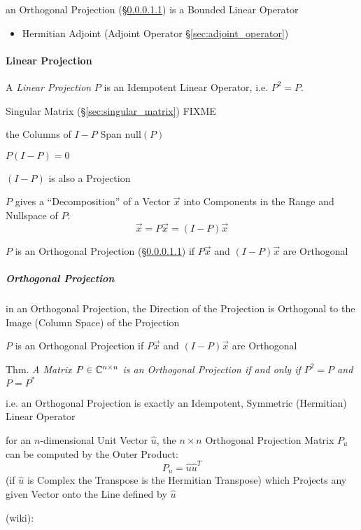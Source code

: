 an Orthogonal Projection (\S\ref{sec:orthogonal_projection}) is a Bounded
Linear Operator

\begin{itemize}
  \item Hermitian Adjoint (Adjoint Operator \S\ref{sec:adjoint_operator})
\end{itemize}



\paragraph{Linear Projection}\label{sec:projection}\hfill

A \emph{Linear Projection} $P$ is an Idempotent Linear Operator, i.e. $P^2 = P$.

Singular Matrix (\S\ref{sec:singular_matrix}) FIXME

the Columns of $I - P$ Span $\mathrm{null}(P)$

$P(I - P) = 0$

$(I - P)$ is also a Projection

$P$ gives a ``Decomposition'' of a Vector $\vec{x}$ into Components in the
Range and Nullspace of $P$:
\[
  \vec{x} = P\vec{x} = (I - P)\vec{x}
\]

$P$ is an Orthogonal Projection (\S\ref{sec:orthogonal_projection}) if
$P\vec{x}$ and $(I-P)\vec{x}$ are Orthogonal



\subparagraph{Orthogonal Projection}\label{sec:orthogonal_projection}\hfill

in an Orthogonal Projection, the Direction of the Projection is Orthogonal to
the Image (Column Space) of the Projection

$P$ is an Orthogonal Projection if $P\vec{x}$ and $(I-P)\vec{x}$ are Orthogonal

Thm. \emph{A Matrix $P \in \mathbb{C}^{n \times n}$ is an Orthogonal Projection if
  and only if $P^2 = P$ and $P = P^*$}

i.e. an Orthogonal Projection is exactly an Idempotent, Symmetric (Hermitian)
Linear Operator

for an $n$-dimensional Unit Vector $\hat{u}$, the $n \times n$ Orthogonal
Projection Matrix $P_u$ can be computed by the Outer Product:
\[
  P_u = \hat{u}\hat{u}^T
\]
(if $\hat{u}$ is Complex the Transpose is the Hermitian Transpose) which
Projects any given Vector onto the Line defined by $\hat{u}$

(wiki):

